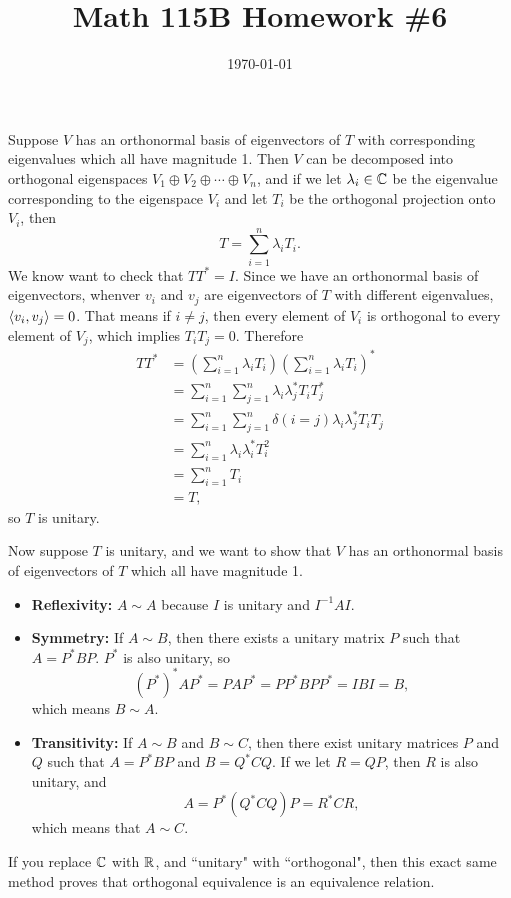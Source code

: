 \documentclass{article}
\date{\today}
\title{Math 115B Homework \#6}
\begin{document}
\maketitle

\begin{prob}
\end{prob}

\bigskip
\par
\begin{prob}
\end{prob}
Suppose $V$ has an orthonormal basis of eigenvectors of $T$ with corresponding eigenvalues which all have magnitude 1. Then $V$ can be decomposed into orthogonal eigenspaces $V_1 \oplus V_2 \oplus \cdots \oplus V_n$, and if we let $\lambda_i \in \mathbb{C}$ be the eigenvalue corresponding to the eigenspace $V_i$ and let $T_i$ be the orthogonal projection onto $V_i$, then
\[ T = \sum_{i=1}^n \lambda_i T_i. \]
We know want to check that $TT^*=I$. Since we have an orthonormal basis of eigenvectors, whenver $v_i$ and $v_j$ are eigenvectors of $T$ with different eigenvalues, $ \left\langle v_i, v_j \right\rangle = 0$. That means if $i \neq j$, then every element of $V_i$ is orthogonal to every element of $V_j$, which implies $T_i T_j = 0$. Therefore
\begin{align*}
    TT^* &= \left( \sum_{i=1}^n \lambda_i T_i \right) \left( \sum_{i=1}^n \lambda_i T_i \right)^* \\
         &= \sum_{i=1}^n \sum_{j=1}^n \lambda_i \lambda_j^* T_i T_j^* \\
         &= \sum_{i=1}^n \sum_{j=1}^n \delta(i = j) \lambda_i \lambda_j^* T_i T_j \\
         &= \sum_{i=1}^n \lambda_i \lambda_i^* T_i^2 \\
         &= \sum_{i=1}^n T_i \\
         &= T,
\end{align*}
so $T$ is unitary.
\bigskip
\par
Now suppose $T$ is unitary, and we want to show that $V$ has an orthonormal basis of eigenvectors of $T$ which all have magnitude 1.

\bigskip
\par
\begin{prob}
\end{prob}
\begin{itemize}
    \item \textbf{Reflexivity:} $A \sim A$ because $I$ is unitary and $I^{-1}AI$.
    \item \textbf{Symmetry:} If $A \sim B$, then there exists a unitary matrix $P$ such that $A=P^*BP$. $P^*$ is also unitary, so
        \[ (P^*)^*AP^* = PAP^* = PP^*BPP^* = IBI = B, \]
        which means $B \sim A$.
    \item \textbf{Transitivity:} If $A \sim B$ and $B \sim C$, then there exist unitary matrices $P$ and $Q$ such that $A=P^*BP$ and $B=Q^*CQ$. If we let $R=QP$, then $R$ is also unitary, and
        \[ A=P^*(Q^*CQ)P = R^*CR, \]
        which means that $A \sim C$.
\end{itemize}
If you replace $\mathbb{C}$ with $\mathbb{R}$, and ``unitary" with ``orthogonal", then this exact same method proves that orthogonal equivalence is an equivalence relation.
\end{document}
